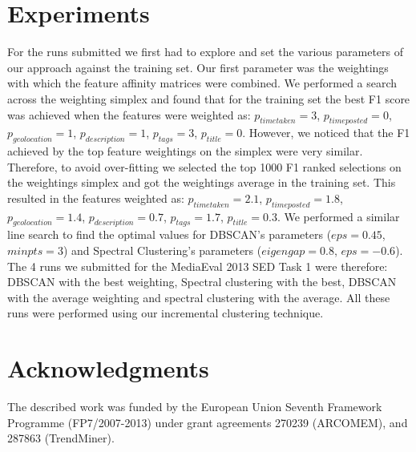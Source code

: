 \documentclass{../acm_proc_article-me11_tweaked}
\begin{document}

\section{Experiments} %
\label{sec:experiments}

For the runs submitted we first had to explore and set the various parameters of our approach against the training set. Our first parameter was the weightings with which the feature affinity matrices were combined. We performed a search across the weighting simplex and found that for the training set the best F1 score was achieved when the features were weighted as: $p_{timetaken}=3$, $p_{timeposted}=0$, $p_{geolocation}=1$, $p_{description}=1$, $p_{tags}=3$, $p_{title}=0$. However, we noticed that the F1 achieved by the top feature weightings on the simplex were very similar. Therefore, to avoid over-fitting we selected the top 1000 F1 ranked selections on the weightings simplex and got the weightings average in the training set. This resulted in the features weighted as: $p_{timetaken}=2.1$, $p_{timeposted}=1.8$, $p_{geolocation}=1.4$, $p_{description}=0.7$, $p_{tags}=1.7$, $p_{title}=0.3$. We performed a similar line search to find the optimal values for DBSCAN's parameters ($eps=0.45$, $minpts=3$) and Spectral Clustering's parameters ($eigengap=0.8$, $eps=-0.6$). The 4 runs we submitted for the MediaEval 2013 SED Task 1 were therefore: DBSCAN with the best weighting, Spectral clustering with the best, DBSCAN with the average weighting and spectral clustering with the average. All these runs were performed using our incremental clustering technique.

\section{Acknowledgments}
The described work was funded by the European Union Seventh Framework Programme (FP7/2007-2013) under grant agreements 270239 (ARCOMEM), and 287863 (TrendMiner).



\end{document}
